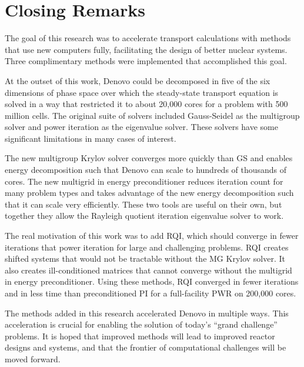 \section{Closing Remarks}
The goal of this research was to accelerate transport calculations with methods that use new computers fully, facilitating the design of better nuclear systems. Three complimentary methods were implemented that accomplished this goal. 

At the outset of this work, Denovo could be decomposed in five of the six dimensions of phase space over which the steady-state transport equation is solved in a way that restricted it to about 20,000 cores for a problem with 500 million cells. The original suite of solvers included Gauss-Seidel as the multigroup solver and power iteration as the eigenvalue solver. These solvers have some significant limitations in many cases of interest. 

The new multigroup Krylov solver converges more quickly than GS and enables energy decomposition such that Denovo can scale to hundreds of thousands of cores. The new multigrid in energy preconditioner reduces iteration count for many problem types and takes advantage of the new energy decomposition such that it can scale very efficiently. These two tools are useful on their own, but together they allow the Rayleigh quotient iteration eigenvalue solver to work.

The real motivation of this work was to add RQI, which should converge in fewer iterations that power iteration for large and challenging problems. RQI creates shifted systems that would not be tractable without the MG Krylov solver. It also creates ill-conditioned matrices that cannot converge without the multigrid in energy preconditioner. Using these methods, RQI converged in fewer iterations and in less time than preconditioned PI for a full-facility PWR on 200,000 cores. 

The methods added in this research accelerated Denovo in multiple ways. This acceleration is crucial for enabling the solution of today's ``grand challenge'' problems. It is hoped that improved methods will lead to improved reactor designs and systems, and that the frontier of computational challenges will be moved forward.  


\separatorpage{}
